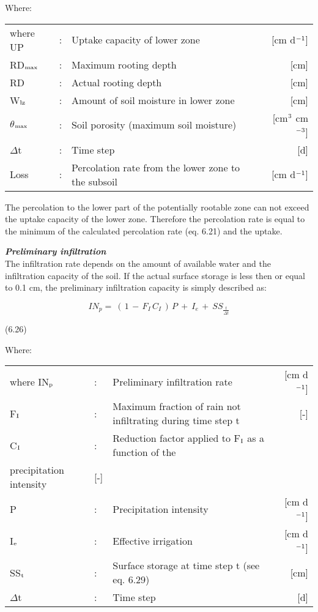 Where:\\
\begin{tabularx}{\textwidth}{llXr}



where UP &:& Uptake capacity of lower zone  & [cm d$^{{\rm -1}}$]\\
RD$_{{\rm max}}$ &:& Maximum rooting depth  & [cm]\\
RD &:& Actual rooting depth  & [cm]\\
W$_{{\rm lz}}$ &:& Amount of soil moisture in lower zone  & [cm]\\
$\theta$$_{{\rm max}}$ &:& Soil porosity (maximum soil moisture)  & [cm$^{{\rm 3}}$ cm$^{{\rm -3}}$]\\
$\Delta$t &:& Time step  & [d]\\
Loss &:& Percolation rate from the lower zone to the subsoil   & [cm d$^{{\rm -1}}$]
\end{tabularx}

 
The percolation to the lower part of the potentially rootable zone can not exceed the
uptake capacity of the lower zone. Therefore the percolation rate is equal to the minimum
of the calculated percolation rate (eq. 6.21) and the uptake.



{\it {\bf Preliminary infiltration}\/}\\
The infiltration rate depends on the amount of available water and the infiltration capacity
of the soil. If the actual surface storage is less then or equal to 0.1 cm, the preliminary
infiltration capacity is simply described as:

\begin{equation}
IN_{p} =~ (\, 1\, -\, F _{I} \, C _{I} \, )\, P~+~ I _{e~} +~ SS _{\frac{t}{ \Delta t}} 
\end{equation}

 
\strut\hfill (6.26)

Where:\\
\begin{tabularx}{\textwidth}{llXr}



where IN$_{{\rm p}}$ &:& Preliminary infiltration rate  & [cm d$^{{\rm -1}}$]\\
F$_{{\rm I}}$ &:& Maximum fraction of rain not infiltrating during time step t  & [-]\\
C$_{{\rm I}}$ &:& Reduction factor applied to F$_{{\rm I}}$ as a function of the \\
   precipitation intensity  & [-]\\
P &:& Precipitation intensity  & [cm d$^{{\rm -1}}$]\\
I$_{{\rm e}}$ &:& Effective irrigation  & [cm d$^{{\rm -1}}$]\\
SS$_{{\rm t}}$ &:& Surface storage at time step t (see eq. 6.29)  & [cm]\\
$\Delta$t &:& Time step  & [d]
\end{tabularx}

